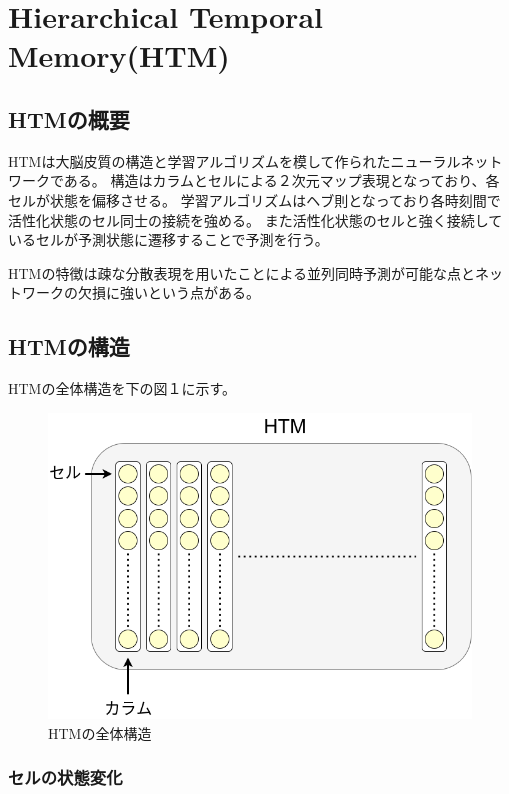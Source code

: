 \chapter{Hierarchical Temporal Memory(HTM)}
\section{HTMの概要}
HTMは大脳皮質の構造と学習アルゴリズムを模して作られたニューラルネットワークである。
構造はカラムとセルによる２次元マップ表現となっており、各セルが状態を偏移させる。
学習アルゴリズムはヘブ則となっており各時刻間で活性化状態のセル同士の接続を強める。
また活性化状態のセルと強く接続しているセルが予測状態に遷移することで予測を行う。

HTMの特徴は疎な分散表現を用いたことによる並列同時予測が可能な点とネットワークの欠損に強いという点がある。

\section{HTMの構造}
HTMの全体構造を下の図１に示す。

\begin{center}
  \begin{figure}[ht]
    \includegraphics[scale=0.5]{./fig/drawing_1}
    \caption{HTMの全体構造}
    \label{fig:HTM}
  \end{figure}
\end{center}

\subsection{セルの状態変化}
